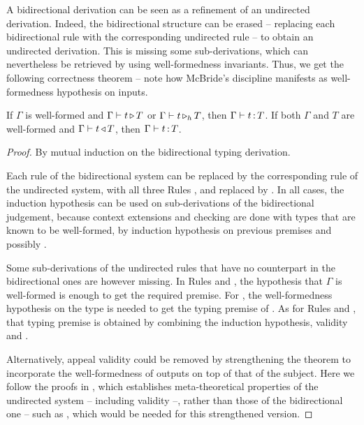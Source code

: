 A bidirectional derivation can be seen as a refinement of an undirected derivation.
Indeed, the bidirectional structure can be erased
– replacing each bidirectional rule with the corresponding undirected rule – to obtain an undirected derivation. This is missing some sub-derivations,
which can nevertheless be retrieved by using well-formedness invariants.
Thus, we get the following correctness theorem – note how McBride’s discipline manifests as well-formedness hypothesis on inputs.

\begin{theorem}
  \label{thm:corr-ccomega}
  If $\Gamma$ is well-formed and $\inferty{\Gamma}{t}{T}$ or $\pinferty{h}{\Gamma}{t}{T}$,
  then $\Gamma \vdash t \ty T$.
  If both $\Gamma$ and $T$ are well-formed and
  $\checkty{\Gamma}{t}{T}$, then $\Gamma \vdash t \ty T$. 
\end{theorem}
  
\begin{proof}
  By mutual induction on the bidirectional typing derivation.

  Each rule of the bidirectional system can be replaced by the corresponding rule of the
  undirected system, with all three Rules ,  and  replaced by
  . In all cases, the induction hypothesis can be used on sub-derivations of the bidirectional judgement, because context extensions and checking are
  done with types that are known to be well-formed,
  by induction hypothesis on previous premises and possibly .%

  Some sub-derivations of the undirected rules that have no counterpart
  in the bidirectional ones are however missing.
  In Rules  and ,
  the hypothesis that $\Gamma$ is well-formed is enough to get the required premise.
  For ,
  the well-formedness hypothesis on the type is needed to get the typing premise of
  .
  As for Rules  and ,
  that typing premise is obtained by combining the induction hypothesis,
  validity and .

  Alternatively, appeal validity could be removed by
  strengthening the theorem to incorporate the well-formedness of outputs on top of that of
  the subject. Here we follow the proofs in , which establishes
  meta-theoretical properties of the undirected system – including validity –,
  rather than those of the bidirectional one – such as ,
  which would be needed for this strengthened version.

\end{proof}

